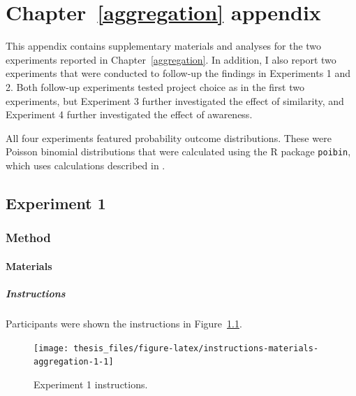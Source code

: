 \documentclass[a4paper, nobind, dvipsnames]{templates/ociamthesis}
\theoremstyle{definition}
\theoremstyle{definition}
\theoremstyle{definition}
\theoremstyle{definition}
\theoremstyle{remark}
\begin{document}
\newpage

\printbibliography[segment=\therefsegment,heading=subbibintoc]

\appendix


\hypertarget{aggregation-appendix}{%
\chapter{Chapter~\ref{aggregation} appendix}\label{aggregation-appendix}}

\minitoc

This appendix contains supplementary materials and analyses for the two
experiments reported in Chapter~\ref{aggregation}. In addition, I also report
two experiments that were conducted to follow-up the findings in Experiments 1
and 2. Both follow-up experiments tested project choice as in the first two
experiments, but Experiment 3 further investigated the effect of similarity, and
Experiment 4 further investigated the effect of awareness.

All four experiments featured probability outcome distributions. These were
Poisson binomial distributions that were calculated using the R package
\texttt{poibin}, which uses calculations described in \textcite{hong2013}.

\section{Experiment 1}

\subsection{Method}

\subsubsection{Materials}

\hypertarget{instructions-materials-aggregation-1-appendix}{%
\paragraph{Instructions}\label{instructions-materials-aggregation-1-appendix}}

Participants were shown the instructions in
Figure~\ref{fig:instructions-materials-aggregation-1}.



\begin{figure}
\texttt{[image: thesis\_files/figure-latex/instructions-materials-aggregation-1-1]} \caption{Experiment 1 instructions.}\label{fig:instructions-materials-aggregation-1}
\end{figure}
\end{document}
